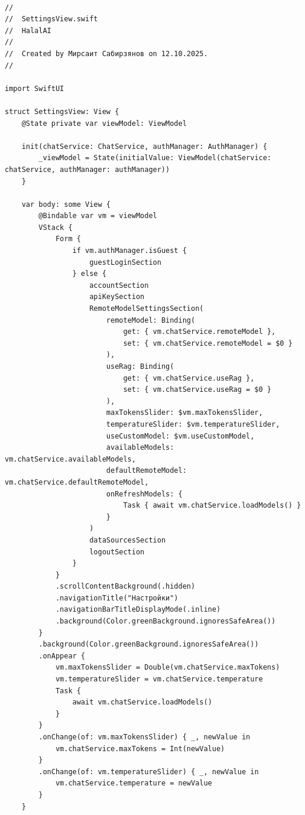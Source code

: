 \begin{lstlisting}[basicstyle=\tiny\ttfamily,breaklines=true]

//
//  SettingsView.swift
//  HalalAI
//
//  Created by Мирсаит Сабирзянов on 12.10.2025.
//

import SwiftUI

struct SettingsView: View {
    @State private var viewModel: ViewModel

    init(chatService: ChatService, authManager: AuthManager) {
        _viewModel = State(initialValue: ViewModel(chatService: chatService, authManager: authManager))
    }
    
    var body: some View {
        @Bindable var vm = viewModel
        VStack {
            Form {
                if vm.authManager.isGuest {
                    guestLoginSection
                } else {
                    accountSection
                    apiKeySection
                    RemoteModelSettingsSection(
                        remoteModel: Binding(
                            get: { vm.chatService.remoteModel },
                            set: { vm.chatService.remoteModel = $0 }
                        ),
                        useRag: Binding(
                            get: { vm.chatService.useRag },
                            set: { vm.chatService.useRag = $0 }
                        ),
                        maxTokensSlider: $vm.maxTokensSlider,
                        temperatureSlider: $vm.temperatureSlider,
                        useCustomModel: $vm.useCustomModel,
                        availableModels: vm.chatService.availableModels,
                        defaultRemoteModel: vm.chatService.defaultRemoteModel,
                        onRefreshModels: {
                            Task { await vm.chatService.loadModels() }
                        }
                    )
                    dataSourcesSection
                    logoutSection
                }
            }
            .scrollContentBackground(.hidden)
            .navigationTitle("Настройки")
            .navigationBarTitleDisplayMode(.inline)
            .background(Color.greenBackground.ignoresSafeArea())
        }
        .background(Color.greenBackground.ignoresSafeArea())
        .onAppear {
            vm.maxTokensSlider = Double(vm.chatService.maxTokens)
            vm.temperatureSlider = vm.chatService.temperature
            Task {
                await vm.chatService.loadModels()
            }
        }
        .onChange(of: vm.maxTokensSlider) { _, newValue in
            vm.chatService.maxTokens = Int(newValue)
        }
        .onChange(of: vm.temperatureSlider) { _, newValue in
            vm.chatService.temperature = newValue
        }
    }
    

\end{lstlisting}

